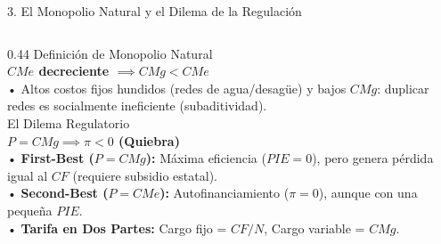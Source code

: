 \documentclass[aspectratio=169, 10pt]{beamer}
\begin{document}
\begin{frame}{3. El Monopolio Natural y el Dilema de la Regulación}
\begin{columns}[T]
    \begin{column}{0.44\textwidth}
      {\scriptsize\color{grisTexto}Definición de Monopolio Natural}\\[1pt]
      {\large\color{azulPrincipal}\textbf{\(CMe\) decreciente \(\implies CMg < CMe\)}}\\[4pt]
      {\scriptsize
        • Altos costos fijos hundidos (redes de agua/desagüe) y bajos \(CMg\): duplicar redes es socialmente ineficiente (subaditividad).\\[4pt]
      }
      {\scriptsize\color{grisTexto}El Dilema Regulatorio}\\[1pt]
      {\large\color{rojoAcento}\textbf{\(P = CMg \implies \pi < 0\) (Quiebra)}}\\[4pt]
      {\scriptsize
        • \textbf{First-Best (\(P = CMg\)):} Máxima eficiencia (\(PIE=0\)), pero genera pérdida igual al \(CF\) (requiere subsidio estatal).\\
        • \textbf{Second-Best (\(P = CMe\)):} Autofinanciamiento (\(\pi = 0\)), aunque con una pequeña \(PIE\).\\
        • \textbf{Tarifa en Dos Partes:} Cargo fijo = \(CF/N\), Cargo variable = \(CMg\).
      }
    \end{column}
  \end{columns}

\end{frame}
\end{document}
